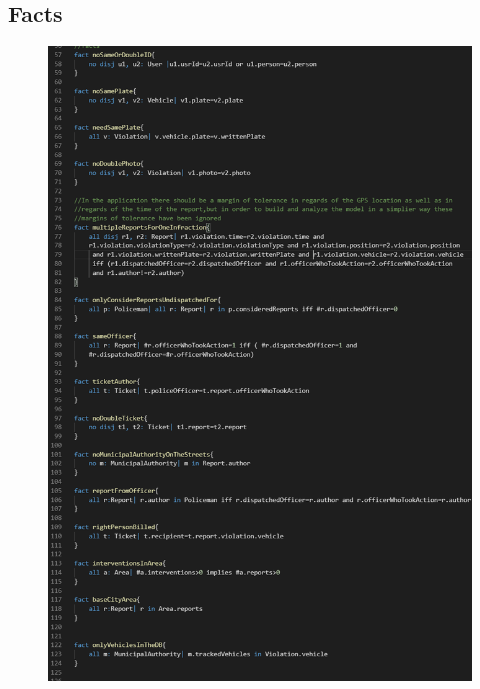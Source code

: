 \subsection{Facts}
\begin{figure}[h!]
	\includegraphics[scale=0.60]{Images/Facts_1-0}
\end{figure}
\newpage
